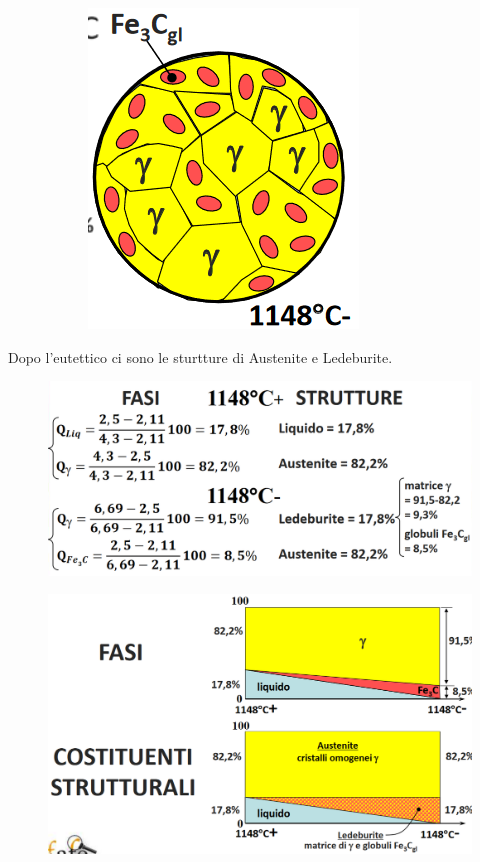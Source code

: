 \documentclass{article}
\begin{document}
{\begin{figure}
\begin{subfigure}[h!]{.3\linewidth}
                    \includegraphics[width=\linewidth]{L14 - C = 2,5 Strutture a 1148-.png}
                \end{subfigure}
            \end{figure}
            \newpage
            Dopo l'eutettico ci sono le sturtture di Austenite e Ledeburite.\\
            \begin{figure}[h!]
                \centering
                \includegraphics[width=.7\linewidth]{L14 - C = 2,5 Calcolo tra 1148+ a 1148-.png}
            \end{figure}
            \begin{figure}[h!]
                \centering
                \includegraphics[width=.7\linewidth]{L14 - C = 2,5 Diagrammi Fase e Costituenti da 1148+ a 1148-.png}

\end{figure}}
\end{document}
